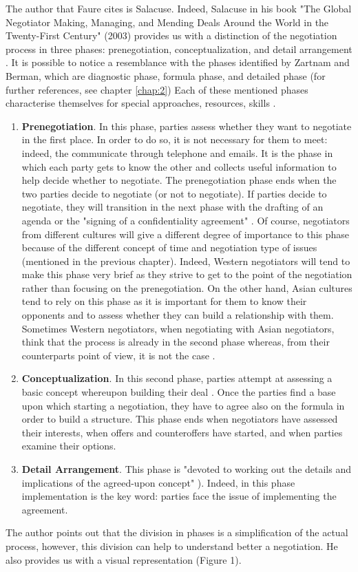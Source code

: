 \documentclass[../main.tex]{subfiles}
\begin{document}
The author that Faure cites is Salacuse. Indeed, Salacuse in his book "The Global Negotiator Making, Managing, and Mending Deals Around the World in the Twenty-First Century" (2003) provides us with a distinction of the negotiation process in three phases: prenegotiation, conceptualization, and detail arrangement \autocite[17]{salacuse1}. It is possible to notice a resemblance with the phases identified by Zartnam and Berman, which are diagnostic phase, formula phase, and detailed phase (for further references, see chapter \ref{chap:2})
Each of these mentioned phases characterise themselves for special approaches, resources, skills \mancite\autocite[17]{salacuse1}.
\begin{enumerate}
    \item \textbf{Prenegotiation}. In this phase, parties assess whether they want to negotiate in the first place. In order to do so, it is not necessary for them to meet: indeed, the communicate through telephone and emails. It is the phase in which each party gets to know the other and collects useful information to help decide whether to negotiate. The prenegotiation phase ends when the two parties decide to negotiate (or not to negotiate). If parties decide to negotiate, they will transition in the next phase with the drafting of an agenda or the "signing of a confidentiality agreement" \mancite\autocite[17]{salacuse1}. Of course, negotiators from different cultures will give a different degree of importance to this phase because of the different concept of time and negotiation type of issues (mentioned in the previous chapter). Indeed, Western negotiators will tend to make this phase very brief as they strive to get to the point of the negotiation rather than focusing on the prenegotiation. On the other hand, Asian cultures tend to rely on this phase as it is important for them to know their opponents and to assess whether they can build a relationship with them. Sometimes Western negotiators, when negotiating with Asian negotiators, think that the process is already in the second phase whereas, from their counterparts point of view, it is not the case \mancite\autocite[17]{salacuse1}.
    \item \textbf{Conceptualization}. In this second phase, parties attempt at assessing a basic concept whereupon building their deal \mancite\autocite[18]{salacuse1}. Once the parties find a base upon which starting a negotiation, they have to agree also on the formula in order to build a structure. This phase ends when negotiators have assessed their interests, when offers and counteroffers have started, and when parties examine their options.
    \item \textbf{Detail Arrangement}. This phase is "devoted to working out the details and implications of the agreed-upon concept" \mancite\autocite[18]{salacuse1}). Indeed, in this phase implementation is the key word: parties face the issue of implementing the agreement.
\end{enumerate}
The author points out that the division in phases is a simplification of the actual process, however, this division can help to understand better a negotiation. He also provides us with a visual representation (Figure 1).
\end{document}
